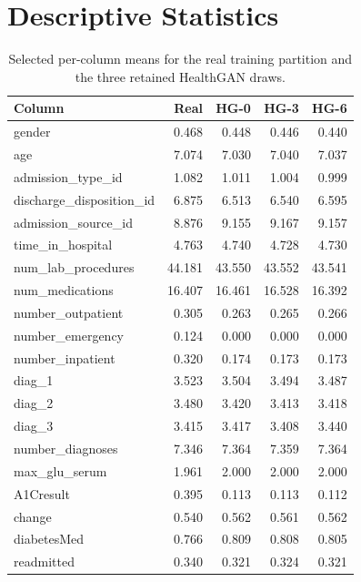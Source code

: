\section{Descriptive Statistics}
\label{app:hg-variants:desc}

\begin{table}[H]
\centering
\small
\caption{Selected per-column means for the real training partition and the
three retained HealthGAN draws.}
\label{app:tab:hg-means}
\begin{tabular}{lrrrr}
\toprule
Column & Real & HG-0 & HG-3 & HG-6 \\
\midrule
gender & 0.468 & 0.448 & 0.446 & 0.440 \\
age & 7.074 & 7.030 & 7.040 & 7.037 \\
admission\_type\_id & 1.082 & 1.011 & 1.004 & 0.999 \\
discharge\_disposition\_id & 6.875 & 6.513 & 6.540 & 6.595 \\
admission\_source\_id & 8.876 & 9.155 & 9.167 & 9.157 \\
time\_in\_hospital & 4.763 & 4.740 & 4.728 & 4.730 \\
num\_lab\_procedures & 44.181 & 43.550 & 43.552 & 43.541 \\
num\_medications & 16.407 & 16.461 & 16.528 & 16.392 \\
number\_outpatient & 0.305 & 0.263 & 0.265 & 0.266 \\
number\_emergency & 0.124 & 0.000 & 0.000 & 0.000 \\
number\_inpatient & 0.320 & 0.174 & 0.173 & 0.173 \\
diag\_1 & 3.523 & 3.504 & 3.494 & 3.487 \\
diag\_2 & 3.480 & 3.420 & 3.413 & 3.418 \\
diag\_3 & 3.415 & 3.417 & 3.408 & 3.440 \\
number\_diagnoses & 7.346 & 7.364 & 7.359 & 7.364 \\
max\_glu\_serum & 1.961 & 2.000 & 2.000 & 2.000 \\
A1Cresult & 0.395 & 0.113 & 0.113 & 0.112 \\
change & 0.540 & 0.562 & 0.561 & 0.562 \\
diabetesMed & 0.766 & 0.809 & 0.808 & 0.805 \\
readmitted & 0.340 & 0.321 & 0.324 & 0.321 \\
\bottomrule
\end{tabular}
\end{table}

